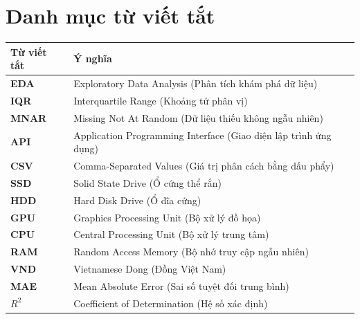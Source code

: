\section*{Danh mục từ viết tắt}

\noindent
\renewcommand{\arraystretch}{1.5}
\begin{tabularx}{\textwidth}{>{\bfseries}l X}
\toprule
\rowcolor{blue!10}
Từ viết tắt & \textbf{Ý nghĩa} \\
\midrule
EDA   & Exploratory Data Analysis (Phân tích khám phá dữ liệu) \\
IQR   & Interquartile Range (Khoảng tứ phân vị) \\
MNAR  & Missing Not At Random (Dữ liệu thiếu không ngẫu nhiên) \\
API   & Application Programming Interface (Giao diện lập trình ứng dụng) \\
CSV   & Comma-Separated Values (Giá trị phân cách bằng dấu phẩy) \\
SSD   & Solid State Drive (Ổ cứng thể rắn) \\
HDD   & Hard Disk Drive (Ổ đĩa cứng) \\
GPU   & Graphics Processing Unit (Bộ xử lý đồ họa) \\
CPU   & Central Processing Unit (Bộ xử lý trung tâm) \\
RAM   & Random Access Memory (Bộ nhớ truy cập ngẫu nhiên) \\
VND   & Vietnamese Dong (Đồng Việt Nam) \\
MAE   & Mean Absolute Error (Sai số tuyệt đối trung bình) \\
$R^2$ & Coefficient of Determination (Hệ số xác định) \\
\bottomrule
\end{tabularx}
